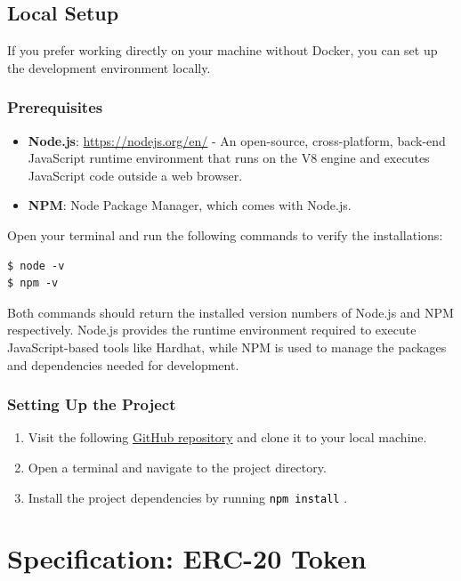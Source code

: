 \documentclass[12pt]{article}
\newcommand{\codegrey}[1]{%
  \texttt{\colorbox{black!4}{\textcolor{black}{#1}}}%
}
\begin{document}
\subsection{Local Setup}

If you prefer working directly on your machine without Docker, you can set up the development environment locally.

\subsubsection*{Prerequisites}
\begin{itemize}
    \item \textbf{Node.js}: \url{https://nodejs.org/en/} - An open-source, cross-platform, back-end JavaScript runtime environment that runs on the V8 engine and executes JavaScript code outside a web browser.
    \item \textbf{NPM}: Node Package Manager, which comes with Node.js.
\end{itemize}

\noindent
Open your terminal and run the following commands to verify the installations:

\begin{verbatim}
$ node -v
$ npm -v
\end{verbatim}

Both commands should return the installed version numbers of Node.js and NPM respectively. Node.js provides the runtime environment required to execute JavaScript-based tools like Hardhat, while NPM is used to manage the packages and dependencies needed for development.

\subsubsection*{Setting Up the Project}

\begin{enumerate}
    \item Visit the following \href{https://github.com/radovluk/Smart-Contract-Exercise/tree/main/03-ERC20-CTUToken/task/task-code}{GitHub repository} and clone it to your local machine.
    \item Open a terminal and navigate to the project directory.
    \item Install the project dependencies by running \codegrey{npm install}.
\end{enumerate}

\section{Specification: ERC-20 Token}
\end{document}
